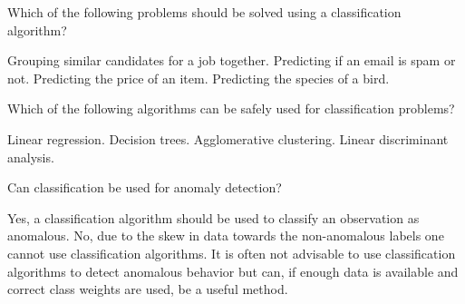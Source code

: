 \documentclass[a4paper,11pt,english,plainsub]{uioexam}
\begin{document}

Which of the following problems should be solved using a
classification algorithm?

\begin{choicelist}[]
  \choice Grouping similar candidates for a job together.
  \choice Predicting if an email is spam or not.
  \choice Predicting the price of an item.
  \choice Predicting the species of a bird.
\end{choicelist}


Which of the following algorithms can be safely used for
classification problems?

\begin{choicelist}[]
  \choice Linear regression.
  \choice Decision trees.
  \choice Agglomerative clustering.
  \choice Linear discriminant analysis.
\end{choicelist}


Can classification be used for anomaly detection?

\begin{choicelist}[]
  \choice Yes, a classification algorithm should be used to classify
  an observation as anomalous.
  \choice No, due to the skew in data towards the non-anomalous labels
  one cannot use classification algorithms.
  \choice It is often not advisable to use classification algorithms
  to detect anomalous behavior but can, if enough data is available
  and correct class weights are used, be a useful method.
\end{choicelist}
\end{document}
